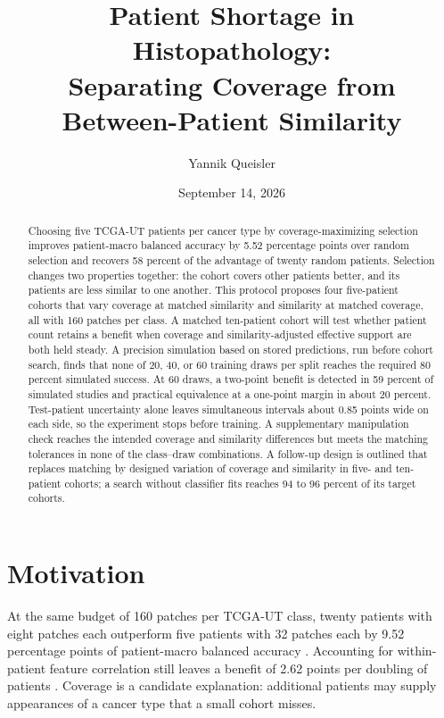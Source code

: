 \documentclass[11pt]{article}
\title{Patient Shortage in Histopathology:\\Separating Coverage from\\Between-Patient Similarity}
\author{Yannik Queisler}
\date{September 14, 2026}
\begin{document}
\raggedbottom
{}
\setlength{\emergencystretch}{2em}
\maketitle
\begin{abstract}
\noindent Choosing five TCGA-UT patients per cancer type by coverage-maximizing selection improves patient-macro balanced accuracy by 5.52 percentage points over random selection and recovers 58 percent of the advantage of twenty random patients. Selection changes two properties together: the cohort covers other patients better, and its patients are less similar to one another. This protocol proposes four five-patient cohorts that vary coverage at matched similarity and similarity at matched coverage, all with 160 patches per class. A matched ten-patient cohort will test whether patient count retains a benefit when coverage and similarity-adjusted effective support are both held steady. A precision simulation based on stored predictions, run before cohort search, finds that none of 20, 40, or 60 training draws per split reaches the required 80 percent simulated success. At 60 draws, a two-point benefit is detected in 59 percent of simulated studies and practical equivalence at a one-point margin in about 20 percent. Test-patient uncertainty alone leaves simultaneous intervals about 0.85 points wide on each side, so the experiment stops before training. A supplementary manipulation check reaches the intended coverage and similarity differences but meets the matching tolerances in none of the class--draw combinations. A follow-up design is outlined that replaces matching by designed variation of coverage and similarity in five- and ten-patient cohorts; a search without classifier fits reaches 94 to 96 percent of its target cohorts.
\end{abstract}
\setcounter{tocdepth}{1}
\tableofcontents
\clearpage

\section{Motivation}
\label{sec:motivation}
At the same budget of 160 patches per TCGA-UT class, twenty patients with eight patches each outperform five patients with 32 patches each by 9.52 percentage points of patient-macro balanced accuracy \citep{queisler2026effectiveSupport}. Accounting for within-patient feature correlation still leaves a benefit of 2.62 points per doubling of patients \citep{queisler2026multidirectionalRedundancy}. Coverage is a candidate explanation: additional patients may supply appearances of a cancer type that a small cohort misses.
\end{document}
